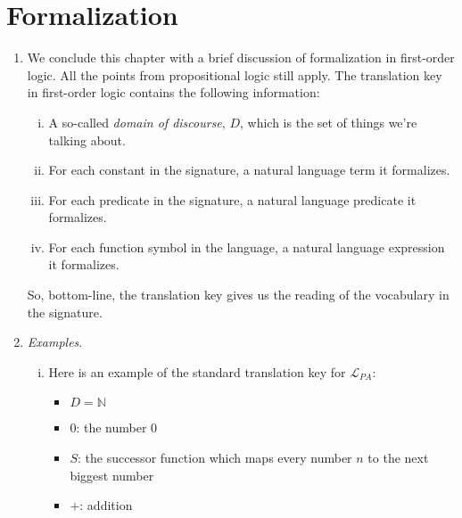 \section{Formalization}

	\begin{enumerate}[\thesection.1]
	
		\item We conclude this chapter with a brief discussion of formalization in first-order logic. All the points from propositional logic still apply. The translation key in first-order logic contains the following information:
		
		\begin{enumerate}[(i)]
		
			\item A so-called \emph{domain of discourse}, $D$, which is the set of things we're talking about.
			
			\item For each constant in the signature, a natural language term it formalizes.
			
			\item For each predicate in the signature, a natural language predicate it formalizes.
			
			\item For each function symbol in the language, a natural language expression it formalizes.
			
		\end{enumerate}
	So, bottom-line, the translation key gives us the reading of the vocabulary in the signature.
	
	\item \emph{Examples}. 
	
		\begin{enumerate}[(i)]
		
		\item Here is an example of the standard translation key for $\mathcal{L}_{PA}$:
		
			\begin{itemize}
		
				\item $D=\mathbb{N}$
				
				\item $0$: the number 0
				
				\item $S$: the successor function which maps every number $n$ to the next biggest number
				
				\item $+$: addition
				

\end{itemize}
\end{enumerate}
\end{enumerate}
